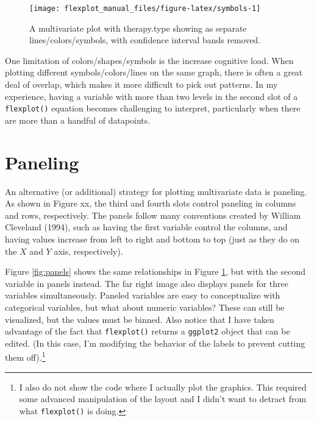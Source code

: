\documentclass[,]{book}
\let\rmarkdownfootnote\footnote%
\def\footnote{\protect\rmarkdownfootnote}
\begin{document}
\begin{figure}

{\centering \texttt{[image: flexplot\_manual\_files/figure-latex/symbols-1]} 

}

\caption{A multivariate plot with therapy.type showing as separate lines/colors/symbols, with confidence interval bands removed.}\label{fig:symbols}
\end{figure}

One limitation of colors/shapes/symbols is the increase cognitive load.
When plotting different symbols/colors/lines on the same graph, there is
often a great deal of overlap, which makes it more difficult to pick out
patterns. In my experience, having a variable with more than two levels
in the second slot of a \texttt{flexplot()} equation becomes challenging
to interpret, particularly when there are more than a handful of
datapoints.

\section*{Paneling}\label{paneling}

An alternative (or additional) strategy for plotting multivariate data
is paneling. As shown in Figure xx, the third and fourth slots control
paneling in columns and rows, respectively. The panels follow many
conventions created by William Cleveland (1994), such as having the
first variable control the columns, and having values increase from left
to right and bottom to top (just as they do on the \(X\) and \(Y\) axis,
respectively).

Figure \ref{fig:panels} shows the same relationships in Figure
\ref{fig:symbols}, but with the second variable in panels instead. The
far right image also displays panels for three variables simultaneously.
Paneled variables are easy to conceptualize with categorical variables,
but what about numeric variables? These can still be visualized, but the
values must be binned. Also notice that I have taken advantage of the
fact that \texttt{flexplot()} returns a \texttt{ggplot2} object that can
be edited. (In this case, I'm modifying the behavior of the labels to
prevent cutting them off).\footnote{I also do not show the code where I
  actually plot the graphics. This required some advanced manipulation
  of the layout and I didn't want to detract from what
  \texttt{flexplot()} is doing.}
\end{document}
